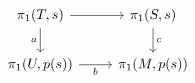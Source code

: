 \documentclass[crop,dvisvgm]{standalone}
\begin{document}
\[\begin {tikzcd}
        \pi _1(T,s)
          \ar [r]
          \ar [d,swap,"a"]
        & \pi _1(S,s)
          \ar [d,"c"]
      \\\pi _1(U,p(s))
        \ar [r,swap,"b"]
        & \pi _1(M,p(s))
      \end {tikzcd}\]
\end{document}

